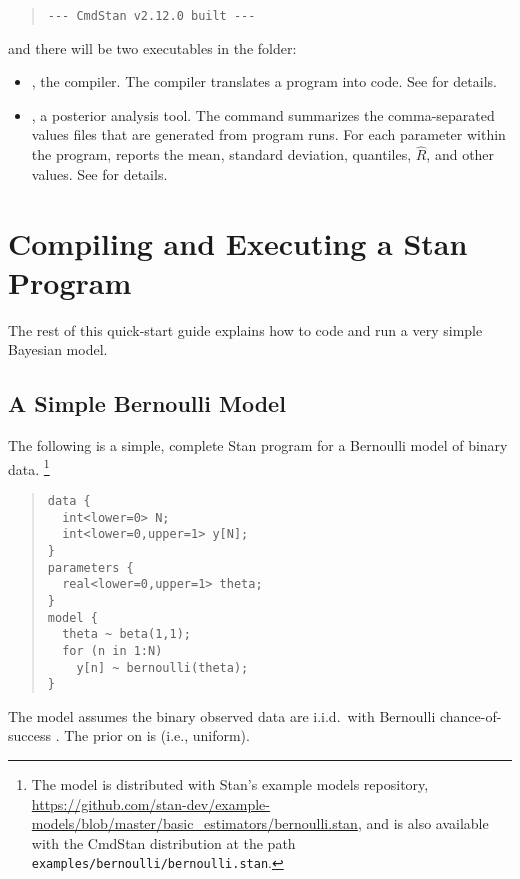 %
\begin{quote}
  \begin{Verbatim}
--- CmdStan v2.12.0 built ---
  \end{Verbatim}
\end{quote}
%
and there will be two executables in the  folder:
%
\begin{itemize}
  \item {}, the \Stan compiler. The \Stan compiler
    translates a \Stan program into \Cpp code. See 
    for details.
  \item {}, a posterior analysis tool. The 
    command summarizes the comma-separated values files that are
    generated from \Stan program runs. For each parameter within the
    \Stan program,  reports the mean, standard deviation,
    quantiles, $\hat{R}$, and other values. See  for
    details.
\end{itemize}

\section{Compiling and Executing a Stan Program}\label{compiling-model.section}

The rest of this quick-start guide explains how to code and run a very
simple Bayesian model.

\subsection{A Simple Bernoulli Model}

The following is a simple, complete Stan program for a Bernoulli model
of binary data.%
%
\footnote{The model is distributed with Stan's example models
  repository,
  \url{https://github.com/stan-dev/example-models/blob/master/basic_estimators/bernoulli.stan},
  and is also available with the CmdStan distribution at the path
  \nolinkurl{examples/bernoulli/bernoulli.stan}.  }
%
\begin{quote}
\begin{Verbatim}
data {
  int<lower=0> N;
  int<lower=0,upper=1> y[N];
}
parameters {
  real<lower=0,upper=1> theta;
}
model {
  theta ~ beta(1,1);
  for (n in 1:N)
    y[n] ~ bernoulli(theta);
}
\end{Verbatim}
\end{quote}
%
The model assumes the binary observed data 
are i.i.d.\ with Bernoulli chance-of-success .  The
prior on  is  (i.e., uniform).

